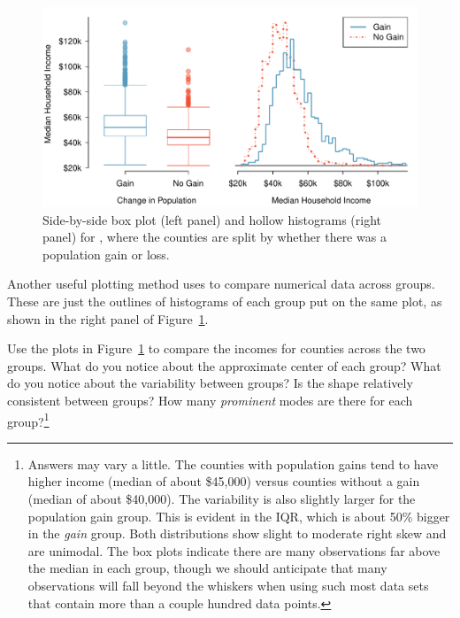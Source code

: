 \begin{figure}
   \centering
   \includegraphics[width=\textwidth]{ch_summarizing_data/figures/countyIncomeSplitByPopGain/countyIncomeSplitByPopGain}
   \caption{Side-by-side box plot (left panel)
       and hollow histograms (right panel) for
       ,
       where the counties are split by whether there was
       a population gain or loss.}
   \label{countyIncomeSplitByPopGain}
\end{figure}

Another useful plotting method uses  to compare numerical data across groups. These are just the outlines of histograms of each group put on the same plot, as shown in the right panel of Figure~\ref{countyIncomeSplitByPopGain}.

\begin{exercise} \label{comparingPriceByTypeExercise}
Use the plots in Figure~\ref{countyIncomeSplitByPopGain}
to compare the incomes for counties across the two groups.
What do you notice about the approximate center of each group?
What do you notice about the variability between groups?
Is the shape relatively consistent between groups?
How many \emph{prominent} modes are there for each
group?\footnote{Answers may vary a little.
  The counties with population gains tend to have higher
  income (median of about \$45,000) versus counties without
  a gain (median of about \$40,000).
  The variability is also slightly larger for the population
  gain group.
  This is evident in the IQR, which is about 50\% bigger
  in the \emph{gain} group.
  Both distributions show slight to moderate right
  skew
  and are unimodal.
  The box plots indicate there are many observations
  far above the median in each group, though we should
  anticipate that many observations will fall beyond
  the whiskers when using such most data sets that
  contain more than a couple hundred data points.}
\end{exercise}

